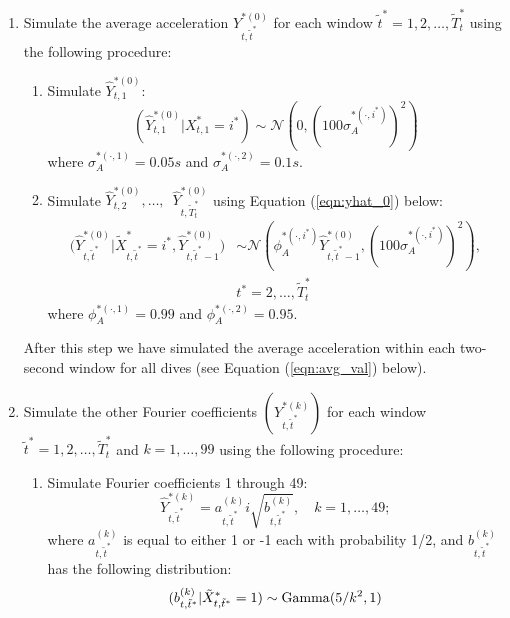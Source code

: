\begin{enumerate}
\item Simulate the average acceleration $Y^{*(0)}_{t,\tilde t^*}$ for each window $\tilde t^* = 1,2,\ldots,\tilde T^*_t$ using the following procedure:
\begin{enumerate}
    \item Simulate $\hat{Y}^{*(0)}_{t,1}$:
    $$
    	(\hat{Y}^{*(0)}_{t,1}|X^*_{t,1} = i^*) \sim \mathcal{N} \left(0, \left(100\sigma_A^{*(\cdot,i^*)}\right)^2 \right)
    $$
    where $\sigma_A^{*(\cdot,1)} = 0.05s$ and $\sigma_A^{*(\cdot,2)} = 0.1s$. 
    \item Simulate $\hat{Y}^{*(0)}_{t,2}, \ldots,\enspace \hat{Y}^{*(0)}_{t,\tilde T^*_t}$ using Equation (\ref{eqn:yhat_0}) below:
    \begin{align}	
        \Big(\hat{Y}^{*(0)}_{t,\tilde t^*}|\tilde X^*_{t,\tilde t^*} = i^*,\hat{Y}^{*(0)}_{t,\tilde t^*-1}\Big) &\sim \mathcal{N} \left(\phi_A^{*(\cdot,i^*)} \hat{Y}^{*(0)}_{t,\tilde t^*-1}, \left(100\sigma_A^{*(\cdot,i^*)}\right)^2 \right), \nonumber \\
        &t^* = 2,\ldots, \tilde T^*_t
    	\label{eqn:yhat_0}
    \end{align}
    where $\phi_A^{*(\cdot,1)} = 0.99$ and $\phi_A^{*(\cdot,2)} = 0.95$. 
    \end{enumerate}
    After this step we have simulated the average acceleration within each two-second window for all dives (see Equation (\ref{eqn:avg_val}) below).
    \item Simulate the other Fourier coefficients $\left(Y^{*(k)}_{t,\tilde t^*}\right)$ for each window $\tilde t^* = 1,2,\ldots,\tilde T^*_t$ and $k = 1,\ldots,99$ using the following procedure:
    \begin{enumerate}
    \item Simulate Fourier coefficients 1 through 49:
    \begin{equation}
        \hat{Y}^{*(k)}_{t,\tilde t^*} = a_{t,\tilde t^*}^{(k)} i\sqrt{b^{(k)}_{t,\tilde t^*}}, \quad k = 1,\ldots,49;
        \label{eqn:abYhat}
    \end{equation}
    where $a^{(k)}_{t,\tilde t^*}$ is equal to either 1 or -1 each with probability 1/2, and $b^{(k)}_{t,\tilde t^*}$ has the following distribution:
    \begin{align}
    \begin{split}
    	(b^{(k)}_{t,\tilde t^*}|\tilde X^*_{t,\tilde t^*} = 1) &\sim {\rm{Gamma}}(5/k^2, 1) \\

\end{split}
\end{align}
\end{enumerate}
\end{enumerate}
